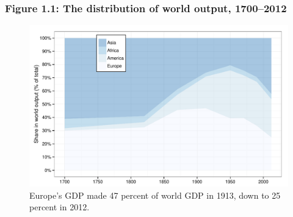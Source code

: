 \documentclass[t]{beamer}\usepackage[]{graphicx}\usepackage[]{color}
\newenvironment{knitrout}{}{} %
\begin{document}
\begin{frame}[label=Figure_1_1]
\frametitle{Figure 1.1: The distribution of world output, 1700--2012}
\begin{figure}[t]
\begin{minipage}[b]{\textwidth}
\centering
\begin{knitrout}\footnotesize
{}\color{fgcolor}

{\centering \includegraphics[width=1\linewidth]{figures/color/Figure_1_1b} 

}



\end{knitrout}
\caption{Europe's GDP made 47 percent of world GDP in 1913, down to 25 percent in 2012.}
\end{minipage}
\end{figure}
\end{frame}
\end{document}
